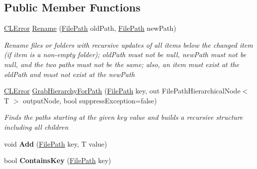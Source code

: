 \subsection*{Public Member Functions}
\begin{DoxyCompactItemize}
\item 
\hyperlink{class_cloud_api_public_1_1_model_1_1_c_l_error}{C\-L\-Error} \hyperlink{class_cloud_api_public_1_1_model_1_1_file_path_dictionary_3_01_t_01_4_a068be02b7d2cde6bae7ac43a24f362fe}{Rename} (\hyperlink{class_cloud_api_public_1_1_model_1_1_file_path}{File\-Path} old\-Path, \hyperlink{class_cloud_api_public_1_1_model_1_1_file_path}{File\-Path} new\-Path)
\begin{DoxyCompactList}\small\item\em Rename files or folders with recursive updates of all items below the changed item (if item is a non-\/empty folder); old\-Path must not be null, new\-Path must not be null, and the two paths must not be the same; also, an item must exist at the old\-Path and must not exist at the new\-Path \end{DoxyCompactList}\item 
\hyperlink{class_cloud_api_public_1_1_model_1_1_c_l_error}{C\-L\-Error} \hyperlink{class_cloud_api_public_1_1_model_1_1_file_path_dictionary_3_01_t_01_4_abf279e695a660a0a7dde5dc122a43647}{Grab\-Hierarchy\-For\-Path} (\hyperlink{class_cloud_api_public_1_1_model_1_1_file_path}{File\-Path} key, out File\-Path\-Hierarchical\-Node$<$ T $>$ output\-Node, bool suppress\-Exception=false)
\begin{DoxyCompactList}\small\item\em Finds the paths starting at the given key value and builds a recursive structure including all children \end{DoxyCompactList}\item 
\hypertarget{class_cloud_api_public_1_1_model_1_1_file_path_dictionary_3_01_t_01_4_a1104bf4bef99cb7857fe60b4bdfc9fdf}{void {\bfseries Add} (\hyperlink{class_cloud_api_public_1_1_model_1_1_file_path}{File\-Path} key, T value)}\label{class_cloud_api_public_1_1_model_1_1_file_path_dictionary_3_01_t_01_4_a1104bf4bef99cb7857fe60b4bdfc9fdf}

\item 
\hypertarget{class_cloud_api_public_1_1_model_1_1_file_path_dictionary_3_01_t_01_4_a8b97ffd76233716dbfd6432df0b56d36}{bool {\bfseries Contains\-Key} (\hyperlink{class_cloud_api_public_1_1_model_1_1_file_path}{File\-Path} key)}\label{class_cloud_api_public_1_1_model_1_1_file_path_dictionary_3_01_t_01_4_a8b97ffd76233716dbfd6432df0b56d36}


\end{DoxyCompactItemize}
